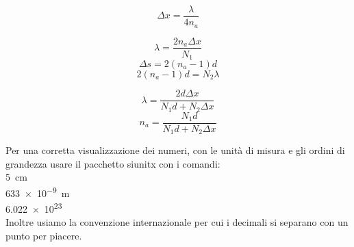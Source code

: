 \documentclass[a4paper,11pt]{article}
\begin{document}
	\label{interf} %
	\label{strum} %
	\label{calib} %
	
	\begin{equation}\label{delta}
	\Delta x = \dfrac{\lambda}{4n_a}
	\end{equation}
	
	\begin{equation}\label{lambdana}
	\lambda=\dfrac{2n_a\Delta x}{N_1}		
	\end{equation}
	\begin{equation}\label{deltavuoto}
	\Delta s = 2(n_a-1)d
	\end{equation}
	\begin{equation}\label{deltatotaria}
	2(n_a-1)d=N_2\lambda
	\end{equation}
	
	\begin{equation}\label{lambda}
	\lambda=\dfrac{2d\Delta x}{N_1 d + N_2 \Delta x}
	\end{equation}
	\begin{equation}\label{na}
	n_a=\dfrac{N_1 d}{N_1 d + N_2 \Delta x}
	\end{equation}
	
	Per una corretta visualizzazione dei numeri, con le unità di misura e gli ordini di grandezza usare il pacchetto siunitx con i comandi:\\
	
		\SI{5}{\centi\meter}
	\\
		\SI{633e-9}{\meter}
	\\
		\num{6.022e23}
	\\
	Inoltre usiamo la convenzione internazionale per cui i decimali si separano con un punto per piacere.
	

	
\end{document}
